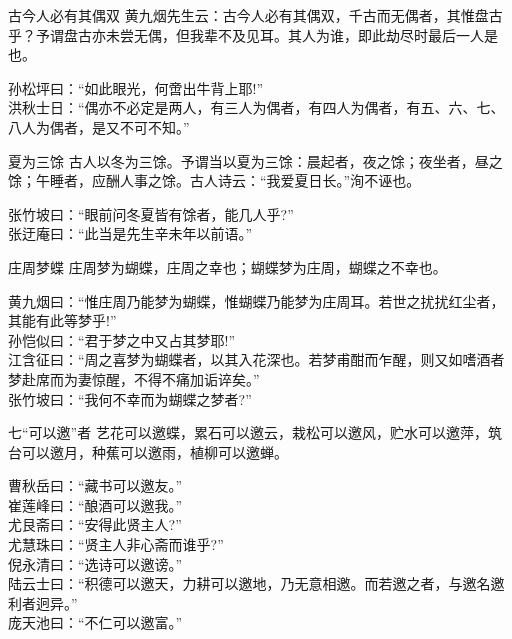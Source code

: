 \begin{yulu}{古今人必有其偶双}
黄九烟先生云：古今人必有其偶双，千古而无偶者，其惟盘古乎？予谓盘古亦未尝无偶，但我辈不及见耳。其人为谁，即此劫尽时最后一人是也。
\begin{comments}
孙松坪曰：“如此眼光，何啻出牛背上耶!” \\
洪秋士日：“偶亦不必定是两人，有三人为偶者，有四人为偶者，有五、六、七、八人为偶者，是又不可不知。”
\end{comments}
\end{yulu}

\begin{yulu}{夏为三馀}
古人以冬为三馀。予谓当以夏为三馀：晨起者，夜之馀；夜坐者，昼之馀；午睡者，应酬人事之馀。古人诗云：“我爱夏日长。”洵不诬也。
\begin{comments}
张竹坡曰：“眼前问冬夏皆有馀者，能几人乎?” \\
张迂庵曰：“此当是先生辛未年以前语。”
\end{comments}
\end{yulu}

\begin{yulu}{庄周梦蝶}
庄周梦为蝴蝶，庄周之幸也；蝴蝶梦为庄周，蝴蝶之不幸也。
\begin{comments}
黄九烟曰：“惟庄周乃能梦为蝴蝶，惟蝴蝶乃能梦为庄周耳。若世之扰扰红尘者，其能有此等梦乎!” \\
孙恺似曰：“君于梦之中又占其梦耶!” \\
江含征曰：“周之喜梦为蝴蝶者，以其入花深也。若梦甫酣而乍醒，则又如嗜酒者梦赴席而为妻惊醒，不得不痛加诟谇矣。” \\
张竹坡曰：“我何不幸而为蝴蝶之梦者?”
\end{comments}
\end{yulu}

\begin{yulu}{七“可以邀”者}
艺花可以邀蝶，累石可以邀云，栽松可以邀风，贮水可以邀萍，筑台可以邀月，种蕉可以邀雨，植柳可以邀蝉。
\begin{comments}
曹秋岳曰：“藏书可以邀友。” \\
崔莲峰曰：“酿酒可以邀我。” \\
尤艮斋曰：“安得此贤主人?” \\
尤慧珠曰：“贤主人非心斋而谁乎?” \\
倪永清曰：“选诗可以邀谤。” \\
陆云士曰：“积德可以邀天，力耕可以邀地，乃无意相邀。而若邀之者，与邀名邀利者迥异。” \\
庞天池曰：“不仁可以邀富。”
\end{comments}
\end{yulu}

